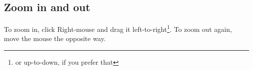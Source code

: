 \documentclass{article}
\begin{document}














\subsection{Zoom in and out}
To zoom in, click Right-mouse and drag it left-to-right\footnote{or
  up-to-down, if you prefer that}. To zoom out again, move the mouse
the opposite way.
\end{document}
